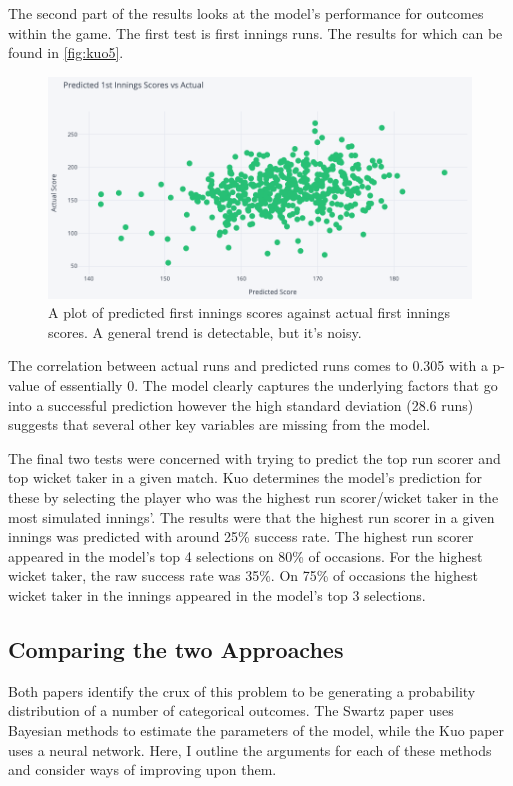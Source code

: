 The second part of the results looks at the model’s performance for outcomes within the game. The first test is first innings runs. The results for which can be found in \autoref{fig:kuo5}.

\begin{figure}
    \centering
    \includegraphics[width=0.9\columnwidth]{images/kuo5.png}
    \caption{A plot of predicted first innings scores against actual first innings scores. A general trend is detectable, but it's noisy.}
    \label{fig:kuo5}
\end{figure}

\clearpage

The correlation between actual runs and predicted runs comes to 0.305 with a p-value of essentially 0. The model clearly captures the underlying factors that go into a successful prediction however the high standard deviation (28.6 runs) suggests that several other key variables are missing from the model.

The final two tests were concerned with trying to predict the top run scorer and top wicket taker in a given match. Kuo determines the model’s prediction for these by selecting the player who was the highest run scorer/wicket taker in the most simulated innings’. The results were that the highest run scorer in a given innings was predicted with around 25\% success rate. The highest run scorer appeared in the model’s top 4 selections on 80\% of occasions. For the highest wicket taker, the raw success rate was 35\%. On 75\% of occasions the highest wicket taker in the innings appeared in the model’s top 3 selections.

\subsection{Comparing the two Approaches}

Both papers identify the crux of this problem to be generating a probability distribution of a number of categorical outcomes. The Swartz paper uses Bayesian methods to estimate the parameters of the model, while the Kuo paper uses a neural network. Here, I outline the arguments for each of these methods and consider ways of improving upon them.

